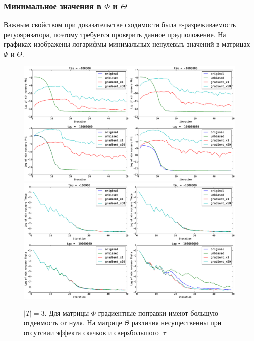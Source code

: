 \documentclass[12pt]{article}
\begin{document}
\subsubsection{Минимальное значения в $\Phi$ и $\Theta$}
Важным свойством при доказательстве сходимости была $\varepsilon$-разреживаемость регуояризатора, поэтому требуется проверить данное предположение. На графиках изображены логарифмы минимальных ненулевыъ значений в матрицах $\Phi$ и $\Theta$.
\begin{figure}[H]
	\centering
	\caption{$|T| = 3$. Для матрицы $\Phi$ градиентные поправки имеют большую отдеимость от нуля. На матрице $\Theta$ различия несущественны при отсутсвии эффекта скачков и сверхбольшого $|\tau|$}    
	\includegraphics[width=1.0\linewidth]{pictures/topics_3_minPhi_values}
	\includegraphics[width=1.0\linewidth]{pictures/topics_3_minTheta_values}
\end{figure}
\end{document}
